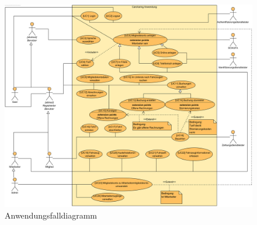 \begin{figure}[H]
    \label{fig:anwendungsfalldiagramm}
    \centering
    \includegraphics[width = \textwidth]{pictures/anwendungsfalldiagramm}
    \caption{Anwendungsfalldiagramm}
\end{figure}
